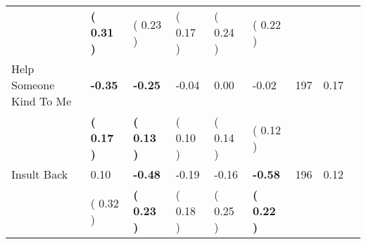 \begin{tabular}{L{6.2cm} C{1.8cm} C{1.8cm} C{1.8cm} C{1.8cm} C{1.8cm} C{1.8cm} C{0.3cm} C{0.3cm}}
 & \textbf{(     0.31 )} & (     0.23 ) & (     0.17 ) & (     0.24 ) & (     0.22 )  & \\
Help Someone Kind To Me & \textbf{    -0.35} & \textbf{    -0.25} &     -0.04 &      0.00 &     -0.02  & 197 &       0.17 \\ 
 & \textbf{(     0.17 )} & \textbf{(     0.13 )} & (     0.10 ) & (     0.14 ) & (     0.12 )  & \\
Insult Back &      0.10 & \textbf{    -0.48} &     -0.19 &     -0.16 & \textbf{    -0.58}  & 196 &       0.12 \\ 
 & (     0.32 ) & \textbf{(     0.23 )} & (     0.18 ) & (     0.25 ) & \textbf{(     0.22 )}  & \\
\bottomrule
\end{tabular}
